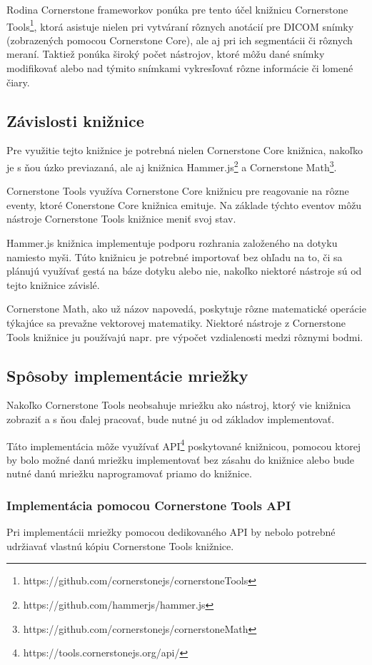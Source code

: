 Rodina Cornerstone frameworkov ponúka pre tento účel knižnicu Cornerstone Tools\footnote{https://github.com/cornerstonejs/cornerstoneTools}, ktorá asistuje nielen pri vytváraní rôznych anotácií pre DICOM snímky (zobrazených pomocou Cornerstone Core), ale aj pri ich segmentácii či rôznych meraní. Taktiež ponúka široký počet nástrojov, ktoré môžu dané snímky modifikovať alebo nad týmito snímkami vykresľovať rôzne informácie či lomené čiary.

\subsection {Závislosti knižnice}
Pre využitie tejto knižnice je potrebná nielen Cornerstone Core knižnica, nakoľko je s ňou úzko previazaná, ale aj knižnica Hammer.js\footnote{https://github.com/hammerjs/hammer.js} a Cornerstone Math\footnote{https://github.com/cornerstonejs/cornerstoneMath}.

Cornerstone Tools využíva Cornerstone Core knižnicu pre reagovanie na rôzne eventy, ktoré Conerstone Core knižnica emituje. Na základe týchto eventov môžu nástroje Cornerstone Tools knižnice meniť svoj stav.

Hammer.js knižnica implementuje podporu rozhrania založeného na dotyku namiesto myši. Túto knižnicu je potrebné importovať bez ohľadu na to, či sa plánujú využívať gestá na báze dotyku alebo nie, nakoľko niektoré nástroje sú od tejto knižnice závislé.

Cornerstone Math, ako už názov napovedá, poskytuje rôzne matematické operácie týkajúce sa prevažne vektorovej matematiky. Niektoré nástroje z Cornerstone Tools knižnice ju používajú napr. pre výpočet vzdialenosti medzi rôznymi bodmi.

\subsection {Spôsoby implementácie mriežky}
Nakoľko Cornerstone Tools neobsahuje mriežku ako nástroj, ktorý vie knižnica zobraziť a s ňou ďalej pracovať, bude nutné ju od základov implementovať.

Táto implementácia môže využívať API\footnote{https://tools.cornerstonejs.org/api/} poskytované knižnicou, pomocou ktorej by bolo možné danú mriežku implementovať bez zásahu do knižnice alebo bude nutné danú mriežku naprogramovať priamo do knižnice.

\subsubsection {Implementácia pomocou Cornerstone Tools API}
Pri implementácii mriežky pomocou dedikovaného API by nebolo potrebné udržiavať vlastnú kópiu Cornerstone Tools knižnice.

